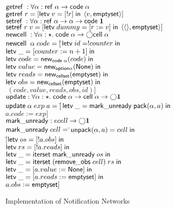 \begin{figure}
\begin{tabbing}
$\mathsf{getref}\; : \forall \alpha : \mathsf{ref}\;\alpha \to \mathsf{code}\;{\alpha}$ \\
$\mathsf{getref}\; r = [\mathsf{letv}\;v = [!r]\;\mathsf{in}\;\left<{v},{\mathsf{emptyset}}\right>]$ \\[1em]

$\mathsf{setref}\; : \forall \alpha : \mathsf{ref}\;\alpha \to \alpha \to \mathsf{code}\;{\mathbf{1}}$ \\
$\mathsf{setref}\; r\;v = [\mathsf{letv}\;dummy = [r := v]\;\mathsf{in}\;\left<{\left<\right>},{\mathsf{emptyset}}\right>]$ \\[1em]

$\mathsf{newcell}\; : \forall \alpha:\star.\; \mathsf{code}\;{\alpha} \to \bigcirc{\mathsf{cell}\;{\alpha}}$ \\
$\mathsf{newcell}\;\;\alpha\;code = [$\=$\mathsf{letv}\;id = !counter\;\mathsf{in}\;$ \\
                                   \>$\mathsf{letv}\;\_ = [counter := n + 1]\;\mathsf{in}\;$ \\
                                   \>$\mathsf{letv}\;code = \mathsf{new}_{\mathsf{code}\;{\alpha}}(code)\;\mathsf{in}\;$ \\
                                   \>$\mathsf{letv}\;value = \mathsf{new}_{\mathsf{option }{\alpha}}(\mathsf{None})\;\mathsf{in}\;$ \\
                                   \>$\mathsf{letv}\;reads = \mathsf{new}_{\mathsf{cellset}}(\mathsf{emptyset})\;\mathsf{in}\;$ \\
                                   \>$\mathsf{letv}\;obs = \mathsf{new}_{\mathsf{cellset}}(\mathsf{emptyset})\;\mathsf{in}\;$ \\
                                   \>$\; (code, value, reads, obs, id)]$ \\[1em]

$\mathsf{update} : \forall \alpha:\star.\; \mathsf{code}\;{\alpha} \to \mathsf{cell}\;{\alpha} \to \bigcirc{\mathbf{1}}$\\
$\mathsf{update}\;\alpha\;exp\;a = 
     [$\=$\mathsf{letv}\;\_ = \mathsf{mark\_unready}\;\mathsf{pack}({\alpha}, {a})\;\mathsf{in}\;$ \\
       \>$a.code := exp]$ \\[1em]

$\mathsf{mark\_unready} : ecell \to \bigcirc{\mathbf{1}}$ \\
$\mathsf{mark\_unready}\;cell =\; $\=$\mathsf{unpack}(\alpha, a) = cell\; \mathsf{in}$\\
\>  $[$\=$\mathsf{letv}\;os = [!a.obs]\;\mathsf{in}\;$ \\
\>     \>$\mathsf{letv}\;rs = [!a.reads]\;\mathsf{in}\;$ \\
\>     \>$\mathsf{letv}\;\_ = \mathsf{iterset}\;\mathsf{mark\_unready}\;os\;\mathsf{in}\;$ \\
\>     \>$\mathsf{letv}\;\_ = \mathsf{iterset}\;(\mathsf{remove\_obs}\;cell)\;rs\;\mathsf{in}\;$ \\
\>     \>$\mathsf{letv}\;\_ = [a.value := \mathsf{None}]\;\mathsf{in}\;$ \\
\>     \>$\mathsf{letv}\;\_ = [a.reads := \mathsf{emptyset}]\;\mathsf{in}\;$ \\
\>     \>$a.obs   := \mathsf{emptyset}]$ 
\end{tabbing}
\caption{Implementation of Notification Networks}
\label{notification-implementation}
\end{figure}

